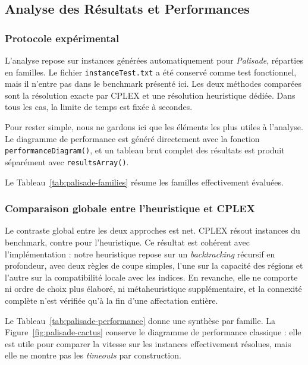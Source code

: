 \subsection{Analyse des Résultats et Performances}



\subsubsection{Protocole expérimental}

L'analyse repose sur \PalisadeBenchmarkInstances{} instances générées automatiquement pour \textit{Palisade}, réparties en \PalisadeBenchmarkFamilies{} familles. Le fichier \texttt{instanceTest.txt} a été conservé comme test fonctionnel, mais il n'entre pas dans le benchmark présenté ici. Les deux méthodes comparées sont la résolution exacte par CPLEX et une résolution heuristique dédiée. Dans tous les cas, la limite de temps est fixée à \PalisadeTimeoutLimit{} secondes.

Pour rester simple, nous ne gardons ici que les éléments les plus utiles à l'analyse. Le diagramme de performance est généré directement avec la fonction \texttt{performanceDiagram()}, et un tableau brut complet des résultats est produit séparément avec \texttt{resultsArray()}.

Le Tableau~\ref{tab:palisade-families} résume les familles effectivement évaluées.



\subsubsection{Comparaison globale entre l'heuristique et CPLEX}

Le contraste global entre les deux approches est net. CPLEX résout \PalisadeCplexSolvedRatio{} instances du benchmark, contre \PalisadeHeuristicSolvedRatio{} pour l'heuristique. Ce résultat est cohérent avec l'implémentation : notre heuristique repose sur un \textit{backtracking} récursif en profondeur, avec deux règles de coupe simples, l'une sur la capacité des régions et l'autre sur la compatibilité locale avec les indices. En revanche, elle ne comporte ni ordre de choix plus élaboré, ni métaheuristique supplémentaire, et la connexité complète n'est vérifiée qu'à la fin d'une affectation entière.

Le Tableau~\ref{tab:palisade-performance} donne une synthèse par famille. La Figure~\ref{fig:palisade-cactus} conserve le diagramme de performance classique : elle est utile pour comparer la vitesse sur les instances effectivement résolues, mais elle ne montre pas les \textit{timeouts} par construction.


